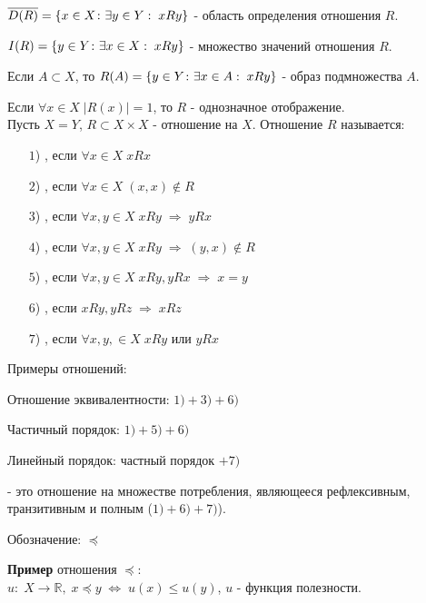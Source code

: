 $\overline{D(R)} = \left\{x \in X\colon\exists y \in Y: \; xRy\right\}$ - область определения отношения $R$.

$I(R) = \left\{y \in Y\colon\exists x \in X: \; xRy\right\}$ - множество значений отношения $R$.

Если $A \subset X$, то $R(A) = \left\{y \in Y\colon\exists x \in A: \; xRy\right\}$ - образ подмножества $A$.

Если $\forall x \in X \; |R(x)| = 1$, то $R$ - однозначное отображение.\\

Пусть $X=Y$, $R \subset X\times X$ - отношение на $X$. Отношение $R$ называется:
\begin{itemize}
	\item[$1$)]
		, если $\forall x \in X \; xRx$
	\item[$2$)]
		, если $\forall x \in X \; (x,x) \not \in R$
	\item[$3$)]
		, если $\forall x, y \in X \; xRy \; \Rightarrow \; yRx$
	\item[$4$)]
		, если $\forall x, y \in X \; xRy \; \Rightarrow \; (y,x) \not \in R$
	\item[$5$)]
		, если $\forall x, y \in X \; xRy, yRx \; \Rightarrow \; x = y$
	\item[$6$)]
		, если $xRy, yRz \; \Rightarrow \; xRz$
	\item[$7$)]
		, если $\forall x, y, \in X \; xRy$ или $yRx$
\end{itemize}

\begin{example}\label{cha:1/example:1}
	Примеры отношений:

	Отношение эквивалентности: $1) + 3) + 6)$

	Частичный порядок: $1) + 5) + 6)$

	Линейный порядок: частный порядок $+ 7)$
\end{example}

\begin{definition}\label{cha:1/def:4}
	 - это отношение на множестве потребления, являющееся рефлексивным, транзитивным и полным ($1) + 6) + 7)$).

	Обозначение: $\preceq$
\end{definition}

\textbf{Пример} отношения $\preceq$:\\

$u: \; X \to \mathbb{R}, \; x \preceq y \; \Leftrightarrow \; u(x) \le u(y)$, $u$ - функция полезности.\\

